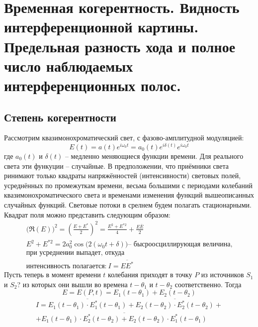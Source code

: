 \section{Временная когерентность. Видность интерференционной картины. Предельная разность хода и полное число наблюдаемых интерференционных полос.}
	\subsection{Степень когерентности}
		Рассмотрим квазимонохроматический свет, с фазово-амплитудной модуляцией:
		\begin{equation*}
		E(t) = a(t)e^{i\omega_{0} t} = a_{0}(t)e^{i\delta(t)}e^{i\omega_{0} t}
		\end{equation*}
		где $a_{0}(t)$ и $\delta(t)$ -- медленно меняющиеся функции времени. Для реального света эти функуции -- случайные.
	В предположении, что приёмники света ринимают только квадраты напряжённостей (интенсивности) световых полей, усреднённых по промежуткам времени, весьма большими с периодами колебаний квазимонохроматического света и временами изменения функций вышеописанных случайных функций. Световые потоки в срелнем будем полагать стационарными.
	Квадрат поля можно представить следующим образом:
	\begin{gather*}
	\big(\Re(E)\big)^{2} = \left( \frac{E + {E}^{*}}{2}\right)^{2} = \frac{E^{2} + {E}^{*2}}{4} + \frac{E\bar{E}}{2}\\
	E^{2} + E^{*2} = 2a_{0}^{2}\cos\big(2(\omega_{0}t + \delta) \big) \text{-- бысроосциллирующая величина,}\\ \text{при усреднении выпадет, откуда}\\
	\text{интенсивность полагается:} \ I = \overline{E{E}^{*}}
	\end{gather*}
	Пусть теперь в момент времени $t$ колебания приходят в точку $P$ из источников $S_{1}$ и $S_{2}$? из которых они вышли во времена $t - \theta_{1}$ и $t - \theta_{2}$ соответственно.
	Тогда
	\begin{equation*}
	E = E(P,t) = E_{1}(t - \theta_{1}) + E_{2}(t - \theta_{2})
	\end{equation*} 
	\begin{multline*}
	I = \overline{E_{1}(t - \theta_{1})\cdot E_{1}^{*}(t - \theta_{1})} + \overline{E_{2}(t - \theta_{2})\cdot E_{2}^{*}(t - \theta_{2})} + \\ + \overline{E_{1}(t - \theta_{1})\cdot E_{2}^{*}(t - \theta_{2}) + E_{2}(t - \theta_{2})\cdot E_{1}^{*}(t - \theta_{1})}
	\end{multline*}
